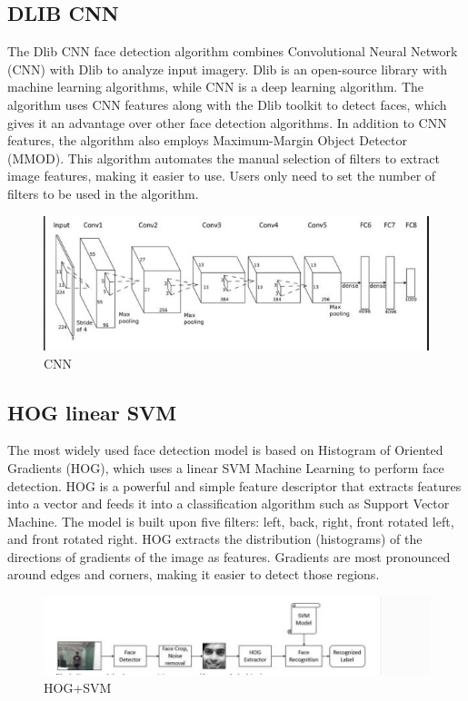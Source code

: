 \subsection{DLIB CNN}
The Dlib CNN face detection algorithm combines Convolutional Neural Network (CNN) with Dlib to analyze input imagery. Dlib is an open-source library with machine learning algorithms, while CNN is a deep learning algorithm. The algorithm uses CNN features along with the Dlib toolkit to detect faces, which gives it an advantage over other face detection algorithms. In addition to CNN features, the algorithm also employs Maximum-Margin Object Detector (MMOD). This algorithm automates the manual selection of filters to extract image features, making it easier to use. Users only need to set the number of filters to be used in the algorithm.
\begin{figure}[!htb]
    \centering
    \includegraphics[width=\linewidth,height=0.2\linewidth]{Figures/Ch01/CNN.png}
    \caption{CNN}
    \label{figure:CNN}
    \end{figure}

\subsection{HOG linear SVM}
The most widely used face detection model is based on Histogram of Oriented Gradients (HOG), which uses a linear SVM Machine Learning to perform face detection. HOG is a powerful and simple feature descriptor that extracts features into a vector and feeds it into a classification algorithm such as Support Vector Machine. The model is built upon five filters: left, back, right, front rotated left, and front rotated right. HOG extracts the distribution (histograms) of the directions of gradients of the image as features. Gradients are most pronounced around edges and corners, making it easier to detect those regions.
\begin{figure}[h]
\centering
\includegraphics[width=\linewidth]{Figures/Ch01/sv.png}
\caption{HOG+SVM}
\label{figure:1}
\end{figure}
\clearpage
